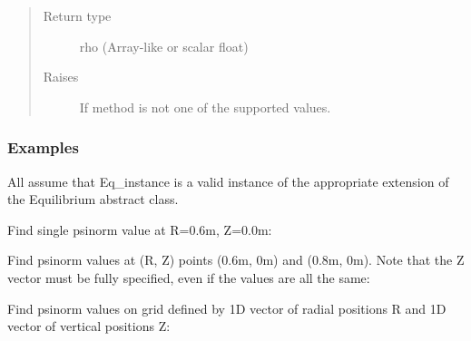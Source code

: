 \documentclass[letterpaper,10pt,english]{sphinxmanual}
\begin{document}
\begin{fulllineitems}
\begin{fulllineitems}
\begin{quote}
\begin{description}
\item[{Return type}] \leavevmode
rho (Array-like or scalar float)

\item[{Raises}] \leavevmode
{} \textendash{} If method is not one of the supported values.

\end{description}\end{quote}
\subsubsection*{Examples}

All assume that Eq\_instance is a valid instance of the appropriate
extension of the Equilibrium abstract class.

Find single psinorm value at R=0.6m, Z=0.0m:

\begin{sphinxVerbatim}[commandchars=\\\{\}]
    
\end{sphinxVerbatim}

Find psinorm values at (R, Z) points (0.6m, 0m) and (0.8m, 0m).
Note that the Z vector must be fully specified,
even if the values are all the same:

\begin{sphinxVerbatim}[commandchars=\\\{\}]
   \PYG{p}{[} \PYG{p}{]} \PYG{p}{[} \PYG{p}{]}
\end{sphinxVerbatim}

Find psinorm values on grid defined by 1D vector of radial positions R
and 1D vector of vertical positions Z:

\begin{sphinxVerbatim}[commandchars=\\\{\}]
     
\end{sphinxVerbatim}


\end{fulllineitems}
\end{fulllineitems}
\end{document}

